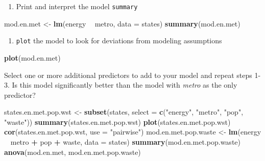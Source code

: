 \documentclass[]{book}
\newenvironment{Shaded}{\begin{snugshade}}{\end{snugshade}}
\newcommand{\KeywordTok}[1]{\textcolor[rgb]{0.13,0.29,0.53}{\textbf{#1}}}
\newcommand{\DataTypeTok}[1]{\textcolor[rgb]{0.13,0.29,0.53}{#1}}
\newcommand{\StringTok}[1]{\textcolor[rgb]{0.31,0.60,0.02}{#1}}
\newcommand{\OperatorTok}[1]{\textcolor[rgb]{0.81,0.36,0.00}{\textbf{#1}}}
\newcommand{\NormalTok}[1]{#1}
\providecommand{\tightlist}{%
  \setlength{\itemsep}{0pt}\setlength{\parskip}{0pt}}
\begin{document}
\begin{enumerate}
\def\labelenumi{\arabic{enumi}.}
\setcounter{enumi}{1}
\tightlist
\item
  Print and interpret the model \texttt{summary}
\end{enumerate}

\begin{Shaded}
\begin{Highlighting}[]
\NormalTok{  mod.en.met <-}\StringTok{ }\KeywordTok{lm}\NormalTok{(energy }\OperatorTok{~}\StringTok{ }\NormalTok{metro, }\DataTypeTok{data =}\NormalTok{ states)}
  \KeywordTok{summary}\NormalTok{(mod.en.met)}
\end{Highlighting}
\end{Shaded}

\begin{enumerate}
\def\labelenumi{\arabic{enumi}.}
\setcounter{enumi}{2}
\tightlist
\item
  \texttt{plot} the model to look for deviations from modeling
  assumptions
\end{enumerate}

\begin{Shaded}
\begin{Highlighting}[]
  \KeywordTok{plot}\NormalTok{(mod.en.met)}
\end{Highlighting}
\end{Shaded}

Select one or more additional predictors to add to your model and repeat
steps 1-3. Is this model significantly better than the model with
\emph{metro} as the only predictor?

\begin{Shaded}
\begin{Highlighting}[]
\NormalTok{  states.en.met.pop.wst <-}\StringTok{ }\KeywordTok{subset}\NormalTok{(states, }\DataTypeTok{select =} \KeywordTok{c}\NormalTok{(}\StringTok{"energy"}\NormalTok{, }\StringTok{"metro"}\NormalTok{, }\StringTok{"pop"}\NormalTok{, }\StringTok{"waste"}\NormalTok{))}
  \KeywordTok{summary}\NormalTok{(states.en.met.pop.wst)}
  \KeywordTok{plot}\NormalTok{(states.en.met.pop.wst)}
  \KeywordTok{cor}\NormalTok{(states.en.met.pop.wst, }\DataTypeTok{use =} \StringTok{"pairwise"}\NormalTok{)}
\NormalTok{  mod.en.met.pop.waste <-}\StringTok{ }\KeywordTok{lm}\NormalTok{(energy }\OperatorTok{~}\StringTok{ }\NormalTok{metro }\OperatorTok{+}\StringTok{ }\NormalTok{pop }\OperatorTok{+}\StringTok{ }\NormalTok{waste, }\DataTypeTok{data =}\NormalTok{ states)}
  \KeywordTok{summary}\NormalTok{(mod.en.met.pop.waste)}
  \KeywordTok{anova}\NormalTok{(mod.en.met, mod.en.met.pop.waste)}
\end{Highlighting}
\end{Shaded}
\end{document}
